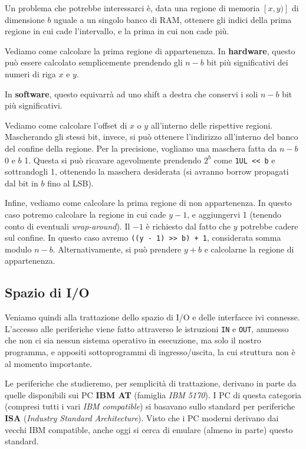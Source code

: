 \documentclass[a4paper,11pt]{article}
\begin{document}
\par\medskip 

Un problema che potrebbe interessarci è, data una regione di memoria $[x, y)]$ di dimensione $b$ uguale a un singolo banco di RAM, ottenere gli indici della prima regione in cui cade l'intervallo, e la prima in cui non cade più.

Vediamo come calcolare la prima regione di appartenenza.
In \textbf{hardware}, questo può essere calcolato semplicemente prendendo gli $n - b$ bit più significativi dei numeri di riga $x$ e $y$.

In \textbf{software}, questo equivarrà ad uno shift a destra che conservi i soli $n-b$ bit più significativi.

Vediamo come calcolare l'offset di $x$ o $y$ all'interno delle rispettive regioni.
Mascherando gli stessi bit, invece, si può ottenere l'indirizzo all'interno del banco del confine della regione.
Per la precisione, vogliamo una maschera fatta da $n - b$ 0 e $b$ 1.
Questa si può ricavare agevolmente prendendo $2^b$ come \lstinline|1UL << b| e sottrandogli 1, ottenendo la maschera desiderata (si avranno borrow propagati dal bit in $b$ fino al LSB).

Infine, vediamo come calcolare la prima regione di non appartenenza.
In questo caso potremo calcolare la regione in cui cade $y - 1$, e aggiungervi 1 (tenendo conto di eventuali \textit{wrap-around}). Il $-1$ è richiesto dal fatto che $y$ potrebbe cadere sul confine.
In questo caso avremo \lstinline|((y - 1) >> b) + 1|, considerata somma modulo $n - b$.
Alternativamente, si può prendere $y + b$ e calcolarne la regione di appartenenza.

\subsection{Spazio di I/O}
Veniamo quindi alla trattazione dello spazio di I/O e delle interfacce ivi connesse.
L'accesso alle periferiche viene fatto attraverso le istruzioni \lstinline|IN| e \lstinline|OUT|, ammesso che non ci sia nessun sistema operativo in esecuzione, ma solo il nostro programma, e appositi sottoprogrammi di ingresso/uscita, la cui struttura non è al momento importante.

Le periferiche che studieremo, per semplicità di trattazione, derivano in parte da quelle disponibili sui PC \textbf{IBM AT} (famiglia \textit{IBM 5170}).
I PC di questa categoria (compresi tutti i vari \textit{IBM compatible}) si basavano sullo standard per periferiche \textbf{ISA} (\textit{Industry Standard Architecture}).
Visto che i PC moderni derivano dai vecchi IBM compatible, anche oggi si cerca di emulare (almeno in parte) questo standard.
\end{document}

